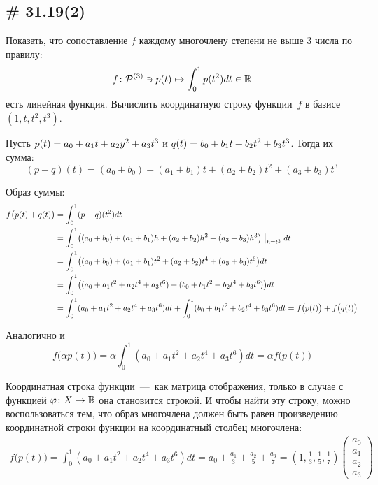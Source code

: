\documentclass[a4paper,12pt]{article}
\begin{document}
  
  \subsection{\# 31.19(2)}

  Показать, что сопоставление $f$ каждому многочлену степени не выше $3$ числа по правилу:
  \[
    f\colon \mathcal P^{(3)} \ni p(t) \mapsto \int_{0}^1 p(t^2) dt \in \operatorname{\mathbb R}
  \]
  есть линейная функция.
  Вычислить координатную строку функции~$f$ в базисе $(1, t, t^2, t^3)$.
  
  \begin{solution}
    Пусть $p(t) \hm= a_0 \hm+ a_1 t \hm+ a_2 y^2 \hm+ a_3 t^3$ и $q(t) \hm= b_0 \hm+ b_1 t \hm+ b_2 t^2 \hm+ b_3 t^3$.
    Тогда их сумма:
    \[
      (p + q)(t) = (a_0 + b_0) + (a_1 + b_1) t + (a_2 + b_2) t^2 + (a_3 + b_3) t^3
    \]
    
    Образ суммы:
    \begin{equation*}
    \begin{split}
      f\bigl(p(t) + q(t)\bigr)
      &= \int_{0}^1 (p + q)(t^2) dt\\
      &= \int_{0}^1 \bigl((a_0 + b_0) + (a_1 + b_1) h + (a_2 + b_2) h^2 + (a_3 + b_3) h^3\bigr)\bigm|
_{h = t^2} dt\\
      &= \int_{0}^1 \bigl((a_0 + b_0) + (a_1 + b_1) t^2 + (a_2 + b_2) t^4 + (a_3 + b_3) t^6\bigr) dt\\
      &= \int_{0}^1 \bigl((a_0 + a_1 t^2 + a_2 t^4 + a_3 t^6) + (b_0 + b_1 t^2 + b_2 t^4 + b_3 t^6)\bigr) dt\\
      &= \int_{0}^1 (a_0 + a_1 t^2 + a_2 t^4 + a_3 t^6) dt + \int_{0}^1 (b_0 + b_1 t^2 + b_2 t^4 + b_3 t^6) dt
      = f\bigl(p(t)\bigr) + f\bigl(q(t)\bigr)
    \end{split}
    \end{equation*}
    
    Аналогично и
    \[
      f\bigl(\alpha p(t)\bigr) = \alpha \int_{0}^1 (a_0 + a_1 t^2 + a_2 t^4 + a_3 t^6) dt = \alpha f\bigl(p(t)\bigr)
    \]
    
    Координатная строка функции~---~как матрица отображения, только в случае с функцией $\phi\colon X \hm\to \RR$ она становится строкой.
    И чтобы найти эту строку, можно воспользоваться тем, что образ многочлена должен быть равен произведению координатной строки функции на координатный столбец многочлена:
    \begin{equation*}
    \begin{split}
      f\bigl(p(t)\bigr)
      = \int_{0}^1 (a_0 + a_1 t^2 + a_2 t^4 + a_3 t^6) dt
      = a_0 + \frac{a_1}{3} + \frac{a_2}{5} + \frac{a_3}{7}
      = \left(1, \frac{1}{3}, \frac{1}{5}, \frac{1}{7}\right) \begin{pmatrix}
        a_0 \\ a_1 \\ a_2 \\ a_3
      \end{pmatrix}
    \end{split}
    \end{equation*}
    

\end{solution}
\end{document}

